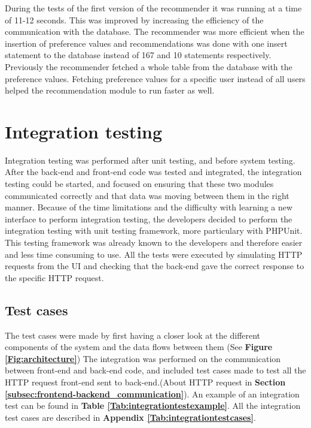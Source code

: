 During the tests of the first version of the recommender it was running at a time of 11-12 seconds. This was improved by increasing the efficiency of the communication with the database. The recommender was more efficient when the insertion of preference values and recommendations was done with one insert statement to the database instead of 167 and 10 statements respectively. Previously the recommender fetched a whole table from the database with the preference values. Fetching preference values for a specific user instead of all users helped the recommendation module to run faster as well.

\section{Integration testing}
\label{sec:integration_testing}

Integration testing was performed after unit testing, and before system testing. After the back-end and front-end code was tested and integrated, the integration testing could be started, and focused on ensuring that these two modules communicated correctly and that data was moving between them in the right manner. 
Because of the time limitations and the difficulty with learning a new interface to perform integration testing, the developers decided to perform the integration testing with unit testing framework, more particulary with PHPUnit. This testing framework was already known to the developers and therefore easier and less time consuming to use. All the tests were executed by simulating HTTP requests from the UI and checking that the back-end gave the correct response to the specific HTTP request. 



\subsection{Test cases}
The test cases were made by first having a closer look at the different components of the system and the data flows between them (See \textbf{Figure \ref{Fig:architecture}}) 
The integration was performed on the communication between front-end and back-end code, and included test cases made to test all the HTTP request front-end sent to back-end.(About HTTP request in \textbf{Section \ref{subsec:frontend-backend_communication}}).
An example of an integration test can be found in \textbf{Table \ref{Tab:integrationtestexample}}. All the integration test cases are described in \textbf{Appendix \ref{Tab:integrationtestcases}}.

